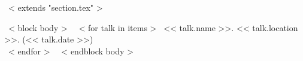 ~< extends "section.tex" >~

~< block body >~
  ~< for talk in items >~
    << talk.name >>. << talk.location >>. (<< talk.date >>) \\
  ~< endfor >~
\vspace{-.15in}
~< endblock body >~
